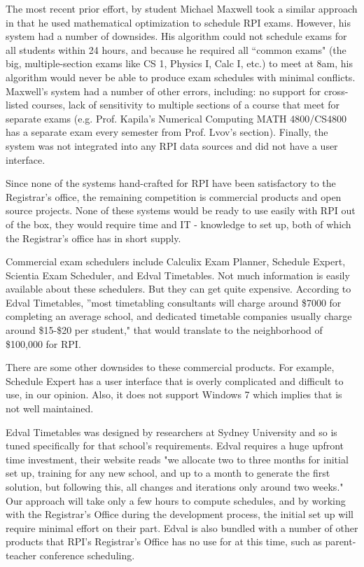 \documentclass[11pt]{article}
\begin{document}
The most recent prior effort, by student Michael Maxwell took a similar approach in that he used mathematical optimization to schedule RPI exams. 
However, his system had a number of downsides. 
His algorithm could not schedule exams for all students within 24 hours, and because he required all ``common exams" (the big, multiple-section exams like CS 1, Physics I, Calc I, etc.) to meet at 8am, his algorithm would never be able to produce exam schedules with minimal conflicts. 
Maxwell's system had a number of other errors, including: no support for cross-listed courses, lack of sensitivity to multiple sections of a course that meet for separate exams (e.g. Prof. Kapila's Numerical Computing MATH 4800/CS4800 has a separate exam every semester from Prof. Lvov's section).  
Finally, the system was not integrated into any RPI data sources and did not have a user interface. 

Since none of the systems hand-crafted for RPI have been satisfactory to the Registrar's office, the remaining competition is commercial products and open source projects. 
None of these systems would be ready to use easily with RPI out of the box, they would require time and IT - knowledge to set up, both of which the Registrar's office has in short supply. 

Commercial exam schedulers include Calculix Exam Planner, Schedule Expert, Scientia Exam Scheduler, and Edval Timetables. Not much information is easily available about these schedulers.  But they can get quite expensive. 
According to Edval Timetables, ''most timetabling consultants will charge around \$7000 for completing an average school, and dedicated timetable companies usually charge around \$15-\$20 per student," that would translate to the neighborhood of \$100,000 for RPI.

There are some other downsides to these commercial products.
For example, Schedule Expert has a user interface that is overly complicated and difficult to use, in our opinion.  
Also, it does not support Windows 7 which implies that is not well maintained.

Edval Timetables was designed by researchers at Sydney University and so is tuned specifically for that school's requirements. 
Edval requires a huge upfront time investment, their website reads "we allocate two to three months for initial set up, training for any new school, and up to a month to generate the first solution, but following this, all changes and iterations only around two weeks."  
Our approach will take only a few hours to compute schedules, and by working with the Registrar's Office during the development process, the initial set up will require minimal effort on their part.
 Edval is also bundled with a number of other products that RPI's Registrar's Office has no use for at this time, such as parent-teacher conference scheduling.
\end{document}
